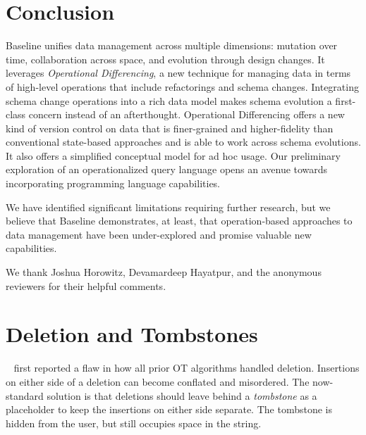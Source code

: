 \documentclass[english,submission]{programming}
\theoremstyle{definition}
\newcommand{\citet}[1]{\citeauthor*{#1}~\cite{#1}}
\begin{document}
\section{Conclusion}

Baseline unifies data management across multiple dimensions: mutation over time, collaboration across space, and evolution through design changes. It leverages \textit{Operational Differencing}, a new technique for managing data in terms of high-level operations that include refactorings and schema changes.
Integrating schema change operations into a rich data model makes schema evolution a first-class concern instead of an afterthought.
Operational Differencing offers a new kind of version control on data that is finer-grained and higher-fidelity than conventional state-based approaches and is able to work across schema evolutions. It also offers a simplified conceptual model for ad hoc usage.
Our preliminary exploration of an operationalized query language opens an avenue towards incorporating programming language capabilities.

We have identified significant limitations requiring further research, but we
believe that Baseline demonstrates, at least, that operation-based approaches to data management have been under-explored and promise valuable new capabilities.



\acks
We thank Joshua Horowitz, Devamardeep Hayatpur, and the anonymous reviewers for their helpful comments.

\appendix

\section{Deletion and Tombstones}\label{deletion}

\citet{Oster06} first reported a flaw in how all prior OT algorithms handled deletion. Insertions on either side of a deletion can become conflated and misordered.
The now-standard solution is that deletions should leave behind a \textit{tombstone} as a placeholder to keep the insertions on either side separate. The tombstone is hidden from the user, but still occupies space in the string.
\end{document}
